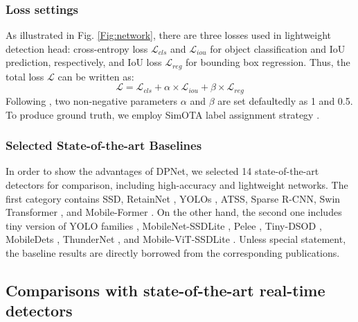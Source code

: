 \documentclass[lettersize,journal]{IEEEtran}
\begin{document}
\subsubsection{Loss settings}
As illustrated in Fig. \ref{Fig:network}, there are three losses used in lightweight detection head: cross-entropy loss $\mathcal{L}_{cls}$ and $\mathcal{L}_{iou}$ for object classification and IoU prediction, respectively, and IoU loss $\mathcal{L}_{reg}$ for bounding box regression. Thus, the total loss $\mathcal{L}$ can be written as:
\begin{equation}\label{eq:total_loss}
	\mathcal{L}= \mathcal{L}_{cls} + \alpha \times \mathcal{L}_{iou}+ \beta \times \mathcal{L}_{reg} 
\end{equation}
Following \cite{ge2021yolox}, two non-negative parameters $\alpha$ and $\beta$ are set defaultedly as 1 and 0.5. To produce ground truth, we employ SimOTA label assignment strategy \cite{ge2021ota,ge2021yolox}.

\subsubsection{Selected State-of-the-art Baselines}
In order to show the advantages of DPNet, we selected 14 state-of-the-art detectors for comparison, including high-accuracy and lightweight networks. The first category contains SSD\cite{liu2016ssd}, RetainNet \cite{lin2017focal}, YOLOs \cite{redmon2018yolov3,wang2021scaled}, ATSS\cite{zhang2020bridging}, Sparse R-CNN\cite{sun2021sparse}, Swin Transformer \cite{liu2021Swin}, and Mobile-Former \cite{chen2021mobile}. On the other hand, the second one includes tiny version of YOLO families \cite{redmon2018yolov3,wang2021scaled}, MobileNet-SSDLite \cite{sandler2018mobilenetv2}, Pelee \cite{Pelee}, Tiny-DSOD \cite{li2018tiny}, MobileDets \cite{xiong2021mobiledets}, ThunderNet \cite{qin2019thundernet}, and Mobile-ViT-SSDLite \cite{mehta2021mobilevit}. Unless special statement, the baseline results are directly borrowed from the corresponding publications.

\subsection{Comparisons with state-of-the-art real-time detectors}
\end{document}
